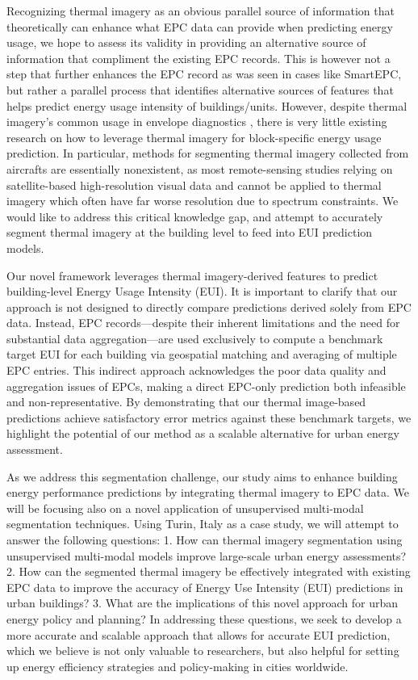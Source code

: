 \documentclass[preprint,12pt]{elsarticle}
\begin{document}
    Recognizing thermal imagery as an obvious parallel source of information that theoretically can enhance what EPC data can provide when predicting energy usage, we hope to assess its validity in providing an alternative source of information that compliment the existing EPC records. This is however not a step that further enhances the EPC record as was seen in cases like SmartEPC\cite{energinvest2024smartEPC}, but rather a parallel process that identifies alternative sources of features that helps predict energy usage intensity of buildings/units. However, despite thermal imagery's common usage in envelope diagnostics \cite{jeong_development_2017}, there is very little existing research on how to leverage thermal imagery for block-specific energy usage prediction. In particular, methods for segmenting thermal imagery collected from aircrafts are essentially nonexistent, as most remote-sensing studies relying on satellite-based high-resolution visual data and cannot be applied to thermal imagery which often have far worse resolution due to spectrum constraints. We would like to address this critical knowledge gap, and attempt to accurately segment thermal imagery at the building level to feed into EUI prediction models. 

    Our novel framework leverages thermal imagery-derived features to predict building-level Energy Usage Intensity (EUI). It is important to clarify that our approach is not designed to directly compare predictions derived solely from EPC data. Instead, EPC records—despite their inherent limitations and the need for substantial data aggregation—are used exclusively to compute a benchmark target EUI for each building via geospatial matching and averaging of multiple EPC entries. This indirect approach acknowledges the poor data quality and aggregation issues of EPCs, making a direct EPC-only prediction both infeasible and non-representative. By demonstrating that our thermal image-based predictions achieve satisfactory error metrics against these benchmark targets, we highlight the potential of our method as a scalable alternative for urban energy assessment.
    
    As we address this segmentation challenge, our study aims to enhance building energy performance predictions by integrating thermal imagery to EPC data. We will be focusing also on a novel application of unsupervised multi-modal segmentation techniques. Using Turin, Italy as a case study, we will attempt to answer the following questions: 1. How can thermal imagery segmentation using unsupervised multi-modal models improve large-scale urban energy assessments? 2. How can the segmented thermal imagery be effectively integrated with existing EPC data to improve the accuracy of Energy Use Intensity (EUI) predictions in urban buildings? 3. What are the implications of this novel approach for urban energy policy and planning? In addressing these questions, we seek to develop a more accurate and scalable approach that allows for accurate EUI prediction, which we believe is not only valuable to researchers, but also helpful for setting up energy efficiency strategies and policy-making in cities worldwide.  
\end{document}
